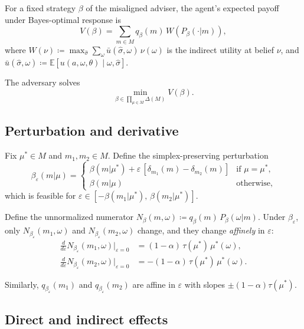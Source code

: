 \documentclass[12pt]{article}
\newcommand{\E}{\mathbb{E}}
\begin{document}
For a fixed strategy $\beta$ of the misaligned adviser, the agent's expected payoff under Bayes-optimal response is
\begin{equation}
\label{eq:value}
V(\beta) = \sum_{m \in M} q_\beta(m)\, W\!\left(P_\beta(\cdot|m)\right),
\end{equation}
where $W(\nu) \coloneqq \max_{\hat\sigma} \sum_\omega \bar{u}(\hat\sigma, \omega)\,\nu(\omega)$ is the indirect utility at belief $\nu$, and $\bar{u}(\hat\sigma, \omega) \coloneqq \E[u(a,\omega,\theta) \mid \omega, \hat\sigma]$.

The adversary solves
\[
\min_{\beta \in \prod_{\mu \in M} \Delta(M)} V(\beta).
\]

\subsection{Perturbation and derivative}

Fix $\mu^* \in M$ and $m_1, m_2 \in M$. Define the simplex-preserving perturbation
\[
\beta_\varepsilon(m|\mu) = \begin{cases}
\beta(m|\mu^*) + \varepsilon\,[\delta_{m_1}(m) - \delta_{m_2}(m)] & \text{if } \mu = \mu^*, \\
\beta(m|\mu) & \text{otherwise},
\end{cases}
\]
which is feasible for $\varepsilon \in [-\beta(m_1|\mu^*),\, \beta(m_2|\mu^*)]$.

Define the unnormalized numerator $N_{\beta}(m,\omega) \coloneqq q_\beta(m)\,P_\beta(\omega|m)$. Under $\beta_\varepsilon$, only $N_{\beta_\varepsilon}(m_1,\omega)$ and $N_{\beta_\varepsilon}(m_2,\omega)$ change, and they change \emph{affinely} in $\varepsilon$:
\begin{align}
\frac{d}{d\varepsilon} N_{\beta_\varepsilon}(m_1,\omega)\Big|_{\varepsilon=0}
&= (1-\alpha)\,\tau(\mu^*)\,\mu^*(\omega), \label{eq:dN1} \\
\frac{d}{d\varepsilon} N_{\beta_\varepsilon}(m_2,\omega)\Big|_{\varepsilon=0}
&= -(1-\alpha)\,\tau(\mu^*)\,\mu^*(\omega). \label{eq:dN2}
\end{align}

Similarly, $q_{\beta_\varepsilon}(m_1)$ and $q_{\beta_\varepsilon}(m_2)$ are affine in $\varepsilon$ with slopes $\pm(1-\alpha)\tau(\mu^*)$.

\subsection{Direct and indirect effects}
\end{document}
